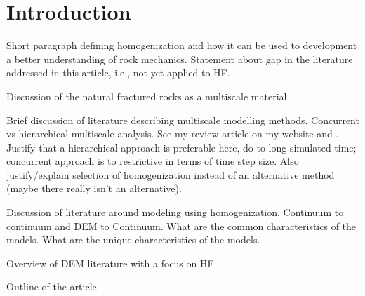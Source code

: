 \section{Introduction}
Short paragraph defining homogenization and how it can be used to development a better understanding of rock mechanics.  Statement about gap in the literature addressed in this article, i.e., not yet applied to HF.

Discussion of the natural fractured rocks as a multiscale material.

Brief discussion of literature describing multiscale modelling methods.  Concurrent vs hierarchical multiscale analysis.  See my review article on my website and \cite{Gracie_2011}. Justify that a hierarchical approach is preferable here, do to long simulated time; concurrent approach is to restrictive in terms of time step size. Also justify/explain selection of homogenization instead of an alternative method (maybe there really isn't an alternative).

Discussion of literature around modeling using homogenization. Continuum to continuum and DEM to Continuum.  What are the common characteristics of the models. What are the unique characteristics of the models.  



Overview of DEM literature with a focus on HF

Outline of the article